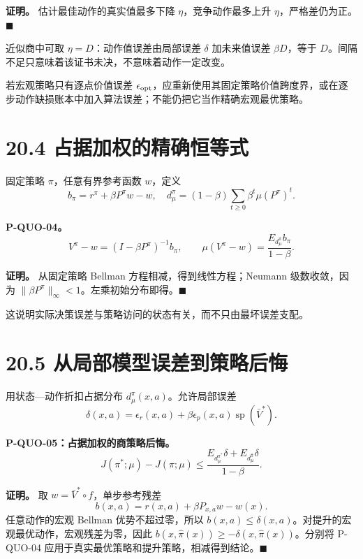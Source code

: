 \documentclass[
  11pt,
  oneside]{book}
\begin{document}
\textbf{证明。} 估计最佳动作的真实值最多下降 \(\eta\)，竞争动作最多上升 \(\eta\)，严格差仍为正。\(\blacksquare\)

近似商中可取 \(\eta=D\)：动作值误差由局部误差 \(\delta\) 加未来值误差 \(\beta D\)，等于 \(D\)。间隔不足只意味着该证书未决，不意味着动作一定改变。

若宏观策略只有逐点价值误差 \(\epsilon_{\rm opt}\)，应重新使用其固定策略价值跨度界，或在逐步动作缺损账本中加入算法误差；不能仍把它当作精确宏观最优策略。

\section{20.4 占据加权的精确恒等式}\label{ux5360ux636eux52a0ux6743ux7684ux7cbeux786eux6052ux7b49ux5f0f}

固定策略 \(\pi\)，任意有界参考函数 \(w\)，定义 \[b_\pi=r^\pi+\beta P^\pi w-w,\quad
d_{\mu}^\pi=(1-\beta)\sum_{t\ge0}\beta^t\mu(P^\pi)^t.\]

\hypertarget{p-quo-04}{}\label{p-quo-04}

\textbf{P-QUO-04。} \[V^\pi-w=(I-\beta P^\pi)^{-1}b_\pi,
\qquad
\mu(V^\pi-w)=\frac{E_{d_\mu^\pi}b_\pi}{1-\beta}.\]

\textbf{证明。} 从固定策略 Bellman 方程相减，得到线性方程；Neumann 级数收敛，因为 \(\|\beta P^\pi\|_\infty<1\)。左乘初始分布即得。\(\blacksquare\)

这说明实际决策误差与策略访问的状态有关，而不只由最坏误差支配。

\section{20.5 从局部模型误差到策略后悔}\label{ux4eceux5c40ux90e8ux6a21ux578bux8befux5deeux5230ux7b56ux7565ux540eux6094}

用状态---动作折扣占据分布 \(d_\mu^\pi(x,a)\)。允许局部误差 \[\delta(x,a)=\epsilon_r(x,a)+
\beta\epsilon_p(x,a)\operatorname{sp}(\bar V^*).\]

\hypertarget{p-quo-05}{}\label{p-quo-05}

\textbf{P-QUO-05：占据加权的商策略后悔。} \[J(\pi^*;\mu)-J(\widehat\pi;\mu)
\le\frac{
E_{d_\mu^{\pi^*}}\delta+
E_{d_\mu^{\widehat\pi}}\delta}{1-\beta}.\]

\textbf{证明。} 取 \(w=\bar V^*\circ f\)，单步参考残差 \[b(x,a)=r(x,a)+\beta P_{x,a}w-w(x).\] 任意动作的宏观 Bellman 优势不超过零，所以 \(b(x,a)\le\delta(x,a)\)。对提升的宏观最优动作，宏观残差为零，因此 \(b(x,\widehat\pi(x))\ge-\delta(x,\widehat\pi(x))\)。分别将 P-QUO-04 应用于真实最优策略和提升策略，相减得到结论。\(\blacksquare\)
\end{document}
